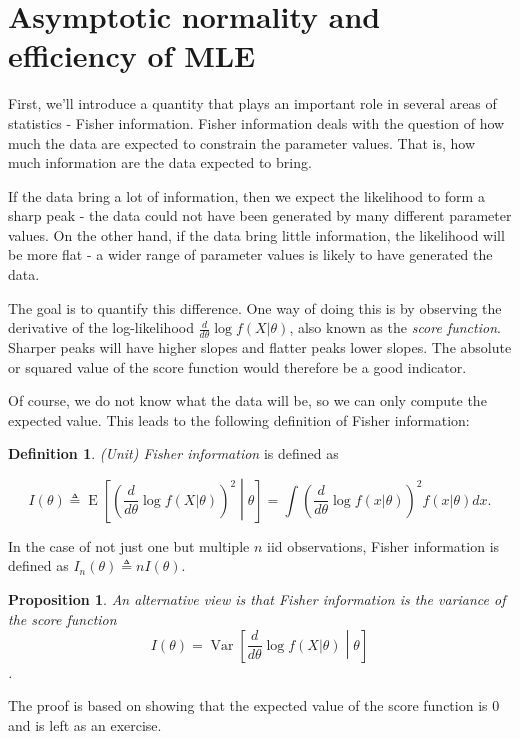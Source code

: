 \documentclass{book}
\theoremstyle{plain}%
\newtheorem{proposition}{Proposition}[section]
\theoremstyle{definition}
\newtheorem{definition}{Definition}[section]
\DeclareMathOperator{\Var}{Var}
\DeclareMathOperator{\E}{E}
\begin{document}
\section{Asymptotic normality and efficiency of MLE}\label{sec:optimality}

First, we'll introduce a quantity that plays an important role in several areas of statistics - Fisher information. Fisher information deals with the question of how much the data are expected to constrain the parameter values. That is, how much information are the data expected to bring.

If the data bring a lot of information, then we expect the likelihood to form a sharp peak - the data could not have been generated by many different parameter values. On the other hand, if the data bring little information, the likelihood will be more flat - a wider range of parameter values is likely to have generated the data.

The goal is to quantify this difference. One way of doing this is by observing the derivative of the log-likelihood $\frac{d}{d\theta} \log f(X|\theta)$, also known as the \emph{score function}. Sharper peaks will have higher slopes and flatter peaks lower slopes. The absolute or squared value of the score function would therefore be a good indicator.

Of course, we do not know what the data will be, so we can only compute the expected value. This leads to the following definition of Fisher information:

\begin{definition} \emph{(Unit) Fisher information} is defined as

$$I(\theta) \triangleq \E\left[\left(\frac{d}{d \theta} \log f(X|\theta)\right)^2  \middle| \theta\right] = \int \left(\frac{d}{d \theta} \log f(x|\theta)\right)^2 f(x|\theta)dx.$$

In the case of not just one but multiple $n$ iid observations, Fisher information is defined as $I_n(\theta) \triangleq nI(\theta)$.
\end{definition}

\begin{proposition} An alternative view is that Fisher information is the variance of the score function
$$I(\theta) = \Var\left[\frac{d}{d\theta} \log f(X|\theta)\middle|\theta\right]$$.
\label{prop:zeromean}
\end{proposition}

The proof is based on showing that the expected value of the score function is 0 and is left as an exercise.
\end{document}
